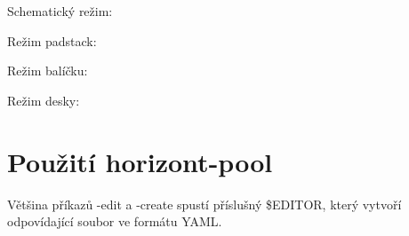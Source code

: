 \documentclass[letterpaper,10pt,czech]{sphinxmanual}
\begin{document}
\begin{DUlineblock}{0em}
\item[] Schematický režim:
\item[] 
\end{DUlineblock}

\begin{DUlineblock}{0em}
\item[] Režim padstack:
\item[] 
\end{DUlineblock}

\begin{DUlineblock}{0em}
\item[] Režim balíčku:
\item[] 
\end{DUlineblock}

\begin{DUlineblock}{0em}
\item[] Režim desky:
\item[] 
\end{DUlineblock}


\section{Použití horizont-pool}
\label{\detokenize{cli-usage:pouziti-horizont-pool}}
Většina příkazů -edit a -create spustí příslušný \$EDITOR, který vytvoří odpovídající soubor ve formátu YAML.
\end{document}
